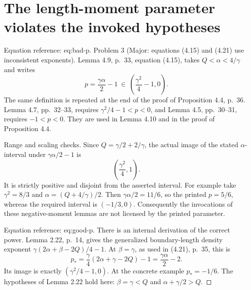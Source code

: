 \documentclass[10pt]{article}
\begin{document}
\section*{The length-moment parameter violates the invoked hypotheses}
Equation reference: eq:bad-p. Problem 3 (Major: equations (4.15) and (4.21) use inconsistent exponents).  Lemma 4.9, p. 33, equation (4.15), takes \(Q<\alpha<4/\gamma\) and writes \[
 p=\frac{\gamma\alpha}{2}-1
 \ \in\ \left(\frac{\gamma^2}{4}-1,0\right).\] The same definition is repeated at the end of the proof of Proposition 4.4, p. 36. Lemma 4.7, pp. 32–33, requires \(\gamma^2/4-1<p<0\), and Lemma 4.5, pp. 30–31, requires \(-1<p<0\). They are used in Lemma 4.10 and in the proof of Proposition 4.4.\par
Range and scaling checks. Since \(Q=\gamma/2+2/\gamma\), the actual image of the stated \(\alpha\)-interval under \(\gamma\alpha/2-1\) is \[\left(\frac{\gamma^2}{4},1\right).\] It is strictly positive and disjoint from the asserted interval. For example take \(\gamma^2=8/3\) and \(\alpha=(Q+4/\gamma)/2\). Then \(\gamma\alpha/2=11/6\), so the printed \(p=5/6\), whereas the required interval is \((-1/3,0)\). Consequently the invocations of these negative-moment lemmas are not licensed by the printed parameter.\par
Equation reference: eq:good-p. There is an internal derivation of the correct power. Lemma 2.22, p. 14, gives the generalized boundary-length density exponent \(\gamma(2\alpha+\beta-2Q)/4-1\). At \(\beta=\gamma\), as used in (4.21), p. 35, this is \[
 p_*=\frac{\gamma}{4}(2\alpha+\gamma-2Q)-1
     =\frac{\gamma\alpha}{2}-2.\] Its image is exactly \((\gamma^2/4-1,0)\). At the concrete example \(p_*=-1/6\). The hypotheses of Lemma 2.22 hold here: \(\beta=\gamma<Q\) and \(\alpha+\gamma/2>Q\). ◻\par
\end{document}
